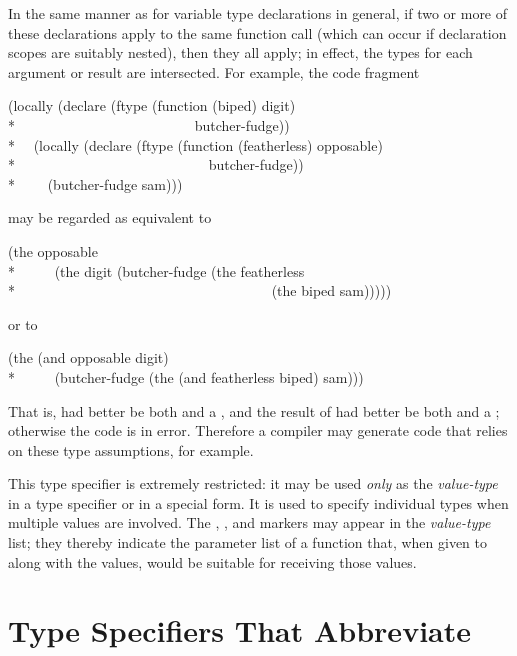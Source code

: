 \begin{flushdesc}
In the same manner as for variable type declarations in general,
if two or more
of these declarations apply to the same function call (which can
occur if declaration scopes are suitably nested), then they all apply;
in effect, the types for each argument or result are intersected.
For example, the code fragment
\begin{lisp}
(locally (declare (ftype (function (biped) digit) \\*
~~~~~~~~~~~~~~~~~~~~~~~~~butcher-fudge)) \\*
~~(locally (declare (ftype (function (featherless) opposable) \\*
~~~~~~~~~~~~~~~~~~~~~~~~~~~butcher-fudge)) \\*
~~~~(butcher-fudge sam)))
\end{lisp}
may be regarded as equivalent to
\begin{lisp}
(the opposable \\*
~~~~~(the digit (butcher-fudge (the featherless \\*
~~~~~~~~~~~~~~~~~~~~~~~~~~~~~~~~~~~~(the biped sam)))))
\end{lisp}
or to
\begin{lisp}
(the (and opposable digit) \\*
~~~~~(butcher-fudge (the (and featherless biped) sam)))
\end{lisp}
That is,  had better be both  and a ,
and the result of  had better be both
 and a ; otherwise the code is in error.
Therefore a compiler may generate code that relies on these type assumptions,
for example.

\item[\cd{(values \emph{value1-type} \emph{value2-type} ...)}]
This type specifier is extremely restricted: it may be used \emph{only}
as the \emph{value-type} in a  type specifier or in
a  special form.  It is used to specify individual types when
multiple values are involved.
The
, , and  markers may appear in the
\emph{value-type} list;
they thereby indicate the parameter list of a
function that, when given to  along with
the values, would be suitable for receiving those values.
\end{flushdesc}

\section{Type Specifiers That Abbreviate}

